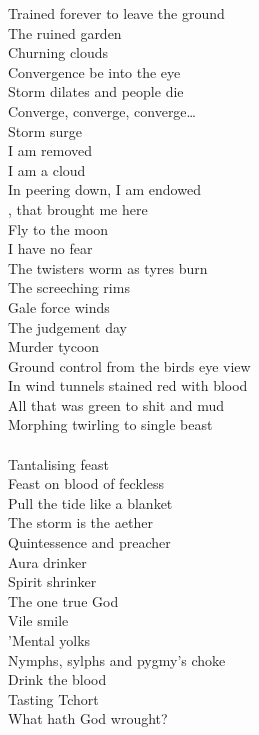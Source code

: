 Trained forever to leave the ground\\
The ruined garden\\
Churning clouds\\
Convergence be into the eye\\
Storm dilates and people die\\

Converge, converge, converge…\\
Storm surge\\

I am removed\\
I am a cloud\\
In peering down, I am endowed\\
, that brought me here\\
Fly to the moon\\
I have no fear\\

The twisters worm as tyres burn\\
The screeching rims\\
Gale force winds\\
The judgement day\\
Murder tycoon\\
Ground control from the birds eye view\\

In wind tunnels stained red with blood\\
All that was green to shit and mud\\

Morphing twirling to single beast\\
\\
Tantalising feast\\

Feast on blood of feckless\\
Pull the tide like a blanket\\

The storm is the aether\\
Quintessence and preacher\\
Aura drinker\\
Spirit shrinker\\
The one true God\\
Vile smile\\
'Mental yolks\\
Nymphs, sylphs and pygmy's choke\\
Drink the blood\\
Tasting Tchort\\
What hath God wrought?\\

